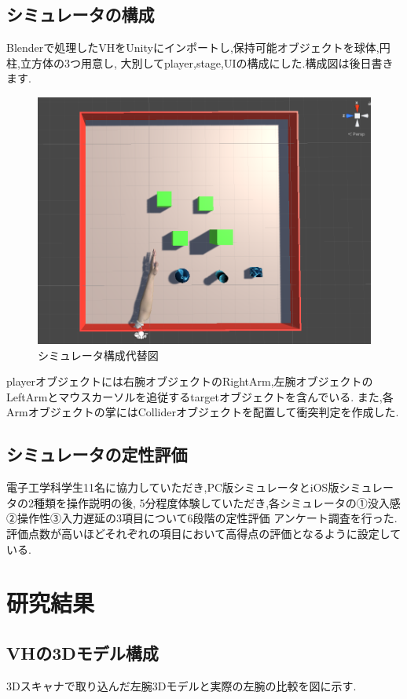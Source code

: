 \documentclass{ltjsreport}
\begin{document}
	\section{シミュレータの構成}
		Blenderで処理したVHをUnityにインポートし,保持可能オブジェクトを球体,円柱,立方体の3つ用意し,
		大別してplayer,stage,UIの構成にした.構成図は後日書きます.
		\begin{figure}[H]
		\centering
		\includegraphics[width = 12cm]{../figs/fieldup.png}
		\caption{シミュレータ構成代替図}
		\label{fig:simuraterconst}
		\end{figure}
		playerオブジェクトには右腕オブジェクトのRightArm,左腕オブジェクトのLeftArmとマウスカーソルを追従するtargetオブジェクトを含んでいる.
		また,各Armオブジェクトの掌にはColliderオブジェクトを配置して衝突判定を作成した.

		
	\section{シミュレータの定性評価}
		電子工学科学生11名に協力していただき,PC版シミュレータとiOS版シミュレータの2種類を操作説明の後,
		5分程度体験していただき,各シミュレータの①没入感②操作性③入力遅延の3項目について6段階の定性評価
		アンケート調査を行った.評価点数が高いほどそれぞれの項目において高得点の評価となるように設定している.

\chapter{研究結果}
	
	\section{VHの3Dモデル構成}
		3Dスキャナで取り込んだ左腕3Dモデルと実際の左腕の比較を図に示す.
\end{document}
